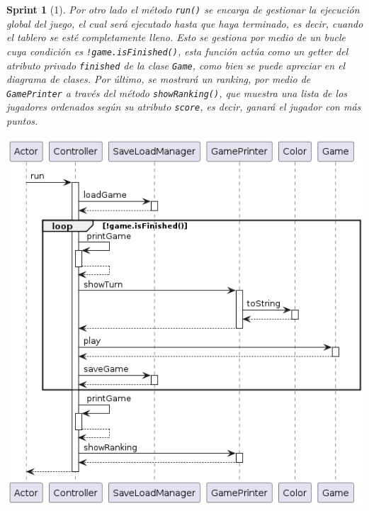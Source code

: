 \documentclass[12pt,a4paper,openright]{book}
\theoremstyle{break}
\newtheorem*{sprint}{Sprint}
\begin{document}
\begin{sprint}[1]
Por otro lado el método \texttt{run()} se encarga de gestionar la ejecución global del juego, el cual será ejecutado hasta que haya terminado, es decir, cuando el tablero se esté completamente lleno. Esto se gestiona por medio de un bucle cuya condición es \texttt{!game.isFinished()}, esta función actúa como un getter del atributo privado \texttt{finished} de la clase \texttt{Game}, como bien se puede apreciar en el diagrama de clases. Por último, se mostrará un ranking, por medio de \texttt{GamePrinter} a través del método \texttt{showRanking()}, que muestra una lista de los jugadores ordenados según su atributo \texttt{score}, es decir, ganará el jugador con más puntos.
\begin{center}
\includegraphics[scale=0.45]{controller-runS1.png}
\end{center}


\end{sprint}
\end{document}
